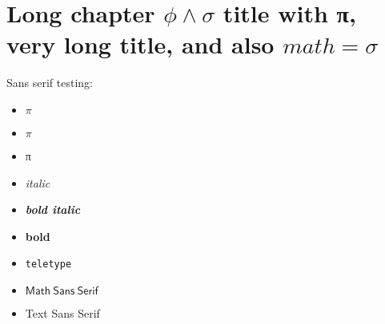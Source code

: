 \chapter{Long chapter \texorpdfstring{$\phi \land \sigma$}{phi and sigma} title with π, very long title, and also \texorpdfstring{$math = \sigma$}{math = sigma}}

Sans serif testing:
\begin{itemize}
    \item \textsf{$\pi$}
    \item \textsf{$π$}
    \item \textsf{π}
    \item \textsf{\emph{italic}}
    \item \textsf{\textbf{\emph{bold italic}}}
    \item \textsf{\textbf{bold}}
    \item \textsf{\texttt{teletype}}
    \item $\mathsf{Math\ Sans\ Serif}$
    \item \textsf{Text Sans Serif}
\end{itemize}

